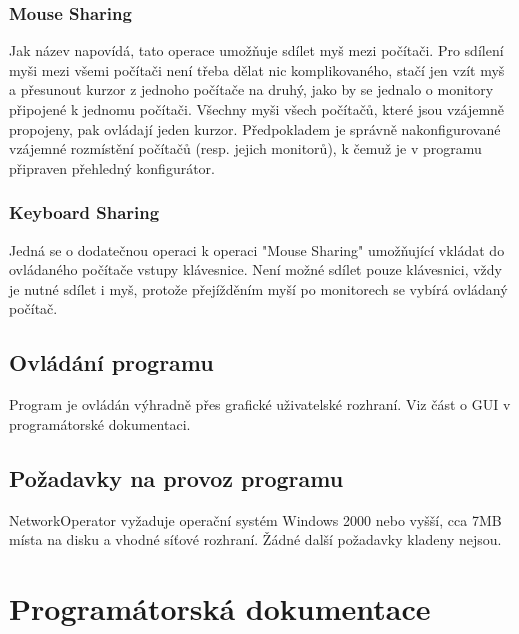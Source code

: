 \documentclass[12pt]{article}
\begin{document}
\subsubsection{Mouse Sharing}
Jak název napovídá, tato operace umožňuje sdílet myš mezi počítači. Pro sdílení myši mezi všemi počítači není třeba dělat nic komplikovaného, stačí jen vzít myš a přesunout kurzor z jednoho počítače na druhý, jako by se jednalo o monitory připojené k jednomu počítači. Všechny myši všech počítačů, které jsou vzájemně propojeny, pak ovládají jeden kurzor. Předpokladem je správně nakonfigurované vzájemné rozmístění počítačů (resp. jejich monitorů), k čemuž je v programu připraven přehledný konfigurátor.

\subsubsection{Keyboard Sharing}
Jedná se o dodatečnou operaci k operaci "Mouse Sharing" umožňující vkládat do ovládaného počítače vstupy klávesnice. Není možné sdílet pouze klávesnici, vždy je nutné sdílet i myš, protože přejížděním myší po monitorech se vybírá ovládaný počítač.

\subsection{Ovládání programu}
Program je ovládán výhradně přes grafické uživatelské rozhraní. Viz část o GUI v programátorské dokumentaci.

\subsection{Požadavky na provoz programu}
NetworkOperator vyžaduje operační systém Windows 2000 nebo vyšší, cca 7MB místa na disku a vhodné síťové rozhraní. Žádné další požadavky kladeny nejsou.

\newpage
\section{Programátorská dokumentace}
\end{document}
